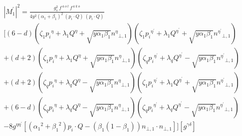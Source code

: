\begin{equation}
\begin{split}
{|{M}^{\prime}_1|}^2 =\frac{g_s^2 \:f^{\:a\:o\:l}\: f^{\:a\:k\:o}}{4y^2({\alpha_1}+\beta_1)^2\:(p_i\cdot Q) \:(p_i\cdot Q)} \\
[(6-d)(\zeta_1 {p_i}^{\eta} + \lambda_1{Q}^{\eta} + \sqrt{y\alpha_1\beta_1}{n^{\eta}}_{\bot,1})(\zeta_1 {p_i}^{{\eta}^{\prime}} + \lambda_1{Q}^{{\eta}^{\prime}} + \sqrt{y\alpha_1\beta_1}{n^{{\eta}^{\prime}}}_{\bot,1})\\
+(d+2)(\zeta_1 {p_i}^{\eta} + \lambda_1{Q}^{\eta} + \sqrt{y\alpha_1\beta_1}{n^{\eta}}_{\bot,1})(\zeta_q {p_i}^{{\eta}^{\prime}} + \lambda_q{Q}^{{\eta}^{\prime}} - \sqrt{y\alpha_1\beta_1}{n^{{\eta}^{\prime}}}_{\bot,1})\\
+(d+2)(\zeta_q {p_i}^{\eta} + \lambda_q{Q}^{\eta} - \sqrt{y\alpha_1\beta_1}{n^{\eta}}_{\bot,1})(\zeta_1 {p_i}^{{\eta}^{\prime}} + \lambda_1{Q}^{{\eta}^{\prime}} + \sqrt{y\alpha_1\beta_1}{n^{{\eta}^{\prime}}}_{\bot,1})\\
+(6-d)(\zeta_q {p_i}^{\eta} + \lambda_q{Q}^{\eta} - \sqrt{y\alpha_1\beta_1}{n^{\eta}}_{\bot,1})(\zeta_q {p_i}^{{\eta}^{\prime}} + \lambda_q{Q}^{{\eta}^{\prime}} - \sqrt{y\alpha_1\beta_1}{n^{{\eta}^{\prime}}}_{\bot,1})\\
-8g^{{\eta}{{\eta}^{\prime}}}[({\alpha_1}^2+{\beta_1}^2) p_i \cdot Q - ({\beta_1}(1-\beta_1)){n}_{\bot,1}\cdot{n}_{\bot,1}]][g^{{\gamma}{{\delta}}}]
\end{split}
\end{equation}

